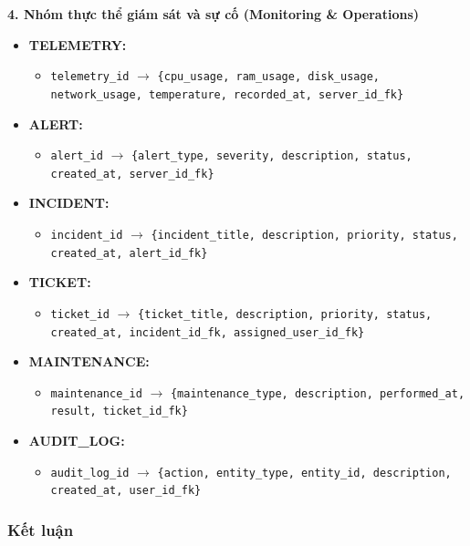 {\textbf{4. Nhóm thực thể giám sát và sự cố (Monitoring \& Operations)}
\begin{itemize}
    \item \textbf{TELEMETRY:}
    \begin{itemize}
        \item \texttt{telemetry\_id} $\rightarrow$ \texttt{\{cpu\_usage, ram\_usage, disk\_usage, network\_usage, temperature, recorded\_at, server\_id\_fk\}}
    \end{itemize}
    \item \textbf{ALERT:}
    \begin{itemize}
        \item \texttt{alert\_id} $\rightarrow$ \texttt{\{alert\_type, severity, description, status, created\_at, server\_id\_fk\}}
    \end{itemize}
    \item \textbf{INCIDENT:}
    \begin{itemize}
        \item \texttt{incident\_id} $\rightarrow$ \texttt{\{incident\_title, description, priority, status, created\_at, alert\_id\_fk\}}
    \end{itemize}
    \item \textbf{TICKET:}
    \begin{itemize}
        \item \texttt{ticket\_id} $\rightarrow$ \texttt{\{ticket\_title, description, priority, status, created\_at, incident\_id\_fk, assigned\_user\_id\_fk\}}
    \end{itemize}
    \item \textbf{MAINTENANCE:}
    \begin{itemize}
        \item \texttt{maintenance\_id} $\rightarrow$ \texttt{\{maintenance\_type, description, performed\_at, result, ticket\_id\_fk\}}
    \end{itemize}
    \item \textbf{AUDIT\_LOG:}
    \begin{itemize}
        \item \texttt{audit\_log\_id} $\rightarrow$ \texttt{\{action, entity\_type, entity\_id, description, created\_at, user\_id\_fk\}}
    \end{itemize}
\end{itemize}
} %

\subsubsection*{Kết luận}

